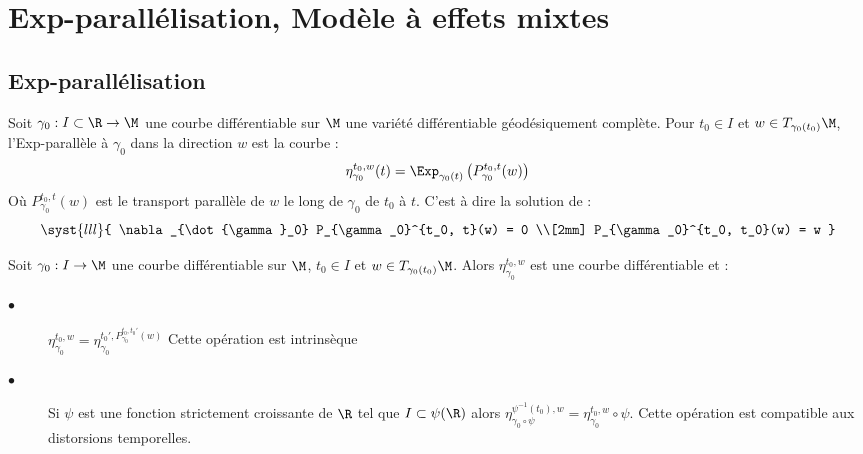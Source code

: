 \section{Exp-parallélisation, Modèle à effets mixtes}

\subsection{Exp-parallélisation}

\begin{definition}
	Soit $\gamma_0 : I \subset \R \rightarrow \M$ une courbe différentiable sur $\M$ une variété différentiable géodésiquement complète. Pour $t_0 \in I$ et $w \in T_{\gamma_0(t_0)} \M$, l'Exp-parallèle à $\gamma_0$ dans la direction $w$ est la courbe :
	\begin{equation}
		\eta_{\gamma_0}^{t_0, w}(t) = \Exp_{\gamma_0(t)} \left( P_{\gamma_0}^{t_0, t}(w) \right)
	\end{equation}
	Où $P_{\gamma_0}^{t_0, t}(w)$ est le transport parallèle de $w$ le long de $\gamma_0$ de $t_0$ à $t$. C'est à dire la solution de :
	\begin{equation}
		\syst{lll}{
			\nabla_{\dot{\gamma}_0} P_{\gamma_0}^{t_0, t}(w) = 0 \\[2mm]
			P_{\gamma_0}^{t_0, t_0}(w) = w
		}
	\end{equation}
\end{definition}

\begin{proposition}
	Soit $\gamma_0 : I \rightarrow \M$ une courbe différentiable sur $\M$, $t_0 \in I$ et $w \in T_{\gamma_0(t_0)} \M$. Alors $\eta_{\gamma_0}^{t_0, w}$ est une courbe différentiable et :
	\begin{description}
		\item[$\bullet$] $\displaystyle \eta_{\gamma_0}^{t_0, w} = \eta_{\gamma_0}^{t_0', P_{\gamma_0}^{t_0, t_0'}(w)}$ \quad Cette opération est intrinsèque
		\item[$\bullet$] Si $\psi$ est une fonction strictement croissante de $\R$ tel que $I \subset \psi(\R)$ alors $\displaystyle \eta_{\gamma_0 \circ \psi}^{\psi^{-1}(t_0), w} = \eta_{\gamma_0}^{t_0, w} \circ \psi$. \quad Cette opération est compatible aux distorsions temporelles.
	\end{description}
\end{proposition}

